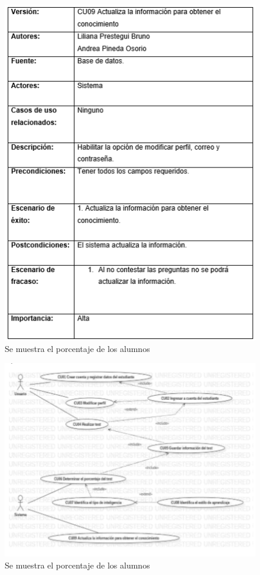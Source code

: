 \documentclass[letterpaper,oneside,openany,11pt]{book}
\begin{document}
\begin{figure}[H]
	\centering
	\includegraphics[width=1.0\textwidth]{./Imagenes/21}
	\caption{Se muestra el porcentaje de los alumnos}
\end{figure}

\begin{figure}[H]
	\centering
	\includegraphics[width=1.0\textwidth]{./Imagenes/22}
	\caption{Se muestra el porcentaje de los alumnos}
\end{figure}
\end{document}
